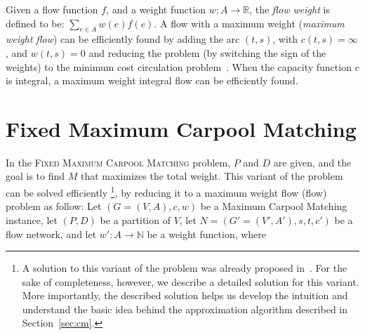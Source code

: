 \documentclass[]{llncs}
\def\R{\mathbb{R}}
\def\N{\mathbb{N}}
\def\CARPOOL{Maximum Carpool Ma\-tching}
\def\FIXEDCARPOOL{Fixed Maximum Carpool Matching}
\begin{document}
Given a flow function $f$, 
and a weight function $w: A \rightarrow \R$, 
the \emph{flow weight} is defined to be:
$\sum_{e \in A}{w(e)f(e)}$.
A flow with a maximum weight (\emph{maximum weight flow}) can be efficiently found by adding 
the arc $(t, s)$, with $c(t,s) = \infty$, and $w(t,s) = 0$ and reducing the problem
(by switching the sign of the weights) 
to the minimum cost circulation problem~\cite{tardos1985strongly}.
When the capacity function $c$ is integral, 
a maximum weight integral flow can be efficiently found.  


\section{\FIXEDCARPOOL{}}
\label{sec:fixed}
In the \textsc{\FIXEDCARPOOL{}} problem, $P$ and $D$ are given, 
and the goal is to find $M$ that maximizes the total weight. 
This variant of the problem can be solved efficiently
\footnote{A solution to this variant of the problem was already proposed in~\cite{hartman2014theory}.
For the sake of completeness, however, we describe a detailed solution for this variant. 
More importantly, 
the described solution helps us develop the intuition and understand the basic idea behind the
approximation algorithm described in Section~\ref{sec:cm}.   
},
by reducing it to a maximum weight flow (flow) problem as
follow:
Let $(G = (V, A), c, w)$ be a \CARPOOL{} instance,
let $(P, D)$ be a partition of $V$,
let  $N = (G' = (V', A'), s, t, c')$ be a flow network, 
and let $w' : A \rightarrow \N$ be a weight function, where 
\end{document}
